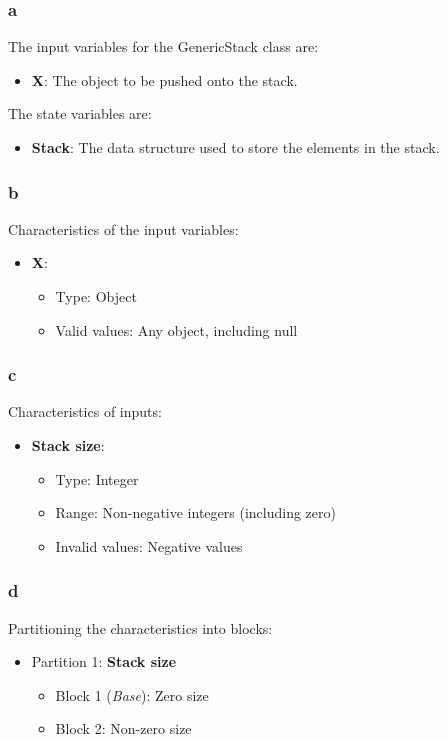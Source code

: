 \documentclass{article}
\begin{document}
\begin{latin}
\subsubsection{a}
The input variables for the GenericStack class are:
\begin{itemize}
\item \textbf{X}: The object to be pushed onto the stack.
\end{itemize}

The state variables are:
\begin{itemize}
    \item \textbf{Stack}: The data structure used to store the elements in the stack.
\end{itemize}

\subsubsection{b}
Characteristics of the input variables:
\begin{itemize}
    \item \textbf{X}:
    \begin{itemize}
        \item Type: Object
        \item Valid values: Any object, including null
    \end{itemize}
\end{itemize}

\subsubsection{c}
Characteristics of inputs:
\begin{itemize}
    \item \textbf{Stack size}:
    \begin{itemize}
        \item Type: Integer
        \item Range: Non-negative integers (including zero)
        \item Invalid values: Negative values
    \end{itemize}
\end{itemize}

\subsubsection{d}
Partitioning the characteristics into blocks:
\begin{itemize}
    \item Partition 1: \textbf{Stack size}
    \begin{itemize}
        \item Block 1 (\textit{Base}): Zero size
        \item Block 2: Non-zero size
    \end{itemize}
\end{itemize}


\end{latin}
\end{document}
